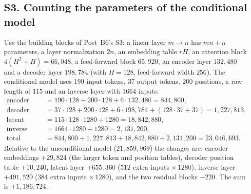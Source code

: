 \documentclass[11pt]{article}
\begin{document}
\label{sec:S3}
\subsection*{S3. Counting the parameters of the conditional model}
Use the building blocks of Post~B6's S3: a linear layer $m\to n$ has $mn+n$ parameters, a layer normalization $2n$, an embedding table $rH$, an attention block $4(H^2+H)=66{,}048$, a feed-forward block $65{,}920$, an encoder layer $132{,}480$ and a decoder layer $198{,}784$ (with $H=128$, feed-forward width $256$). The conditional model uses $190$ input tokens, $37$ output tokens, $200$ positions, a row length of $115$ and an inverse layer with $1664$ inputs:
\begin{align*}
  \text{encoder}&=190\cdot128+200\cdot128+6\cdot132{,}480=844{,}800,\\
  \text{decoder}&=37\cdot128+200\cdot128+6\cdot198{,}784+(128\cdot37+37)=1{,}227{,}813,\\
  \text{latent layer}&=115\cdot128\cdot1280+1280=18{,}842{,}880,\\
  \text{inverse layer}&=1664\cdot1280+1280=2{,}131{,}200,\\
  \text{total}&=844{,}800+1{,}227{,}813+18{,}842{,}880+2{,}131{,}200=23{,}046{,}693 .
\end{align*}
Relative to the unconditional model ($21{,}859{,}969$) the changes are: encoder embeddings $+29{,}824$ (the larger token and position tables), decoder position table $+10{,}240$, latent layer $+655{,}360$ ($512$ extra inputs $\times\,1280$), inverse layer $+491{,}520$ ($384$ extra inputs $\times\,1280$), and the two residual blocks $-220$. The sum is $+1{,}186{,}724$.

\label{sec:S4}
\end{document}
